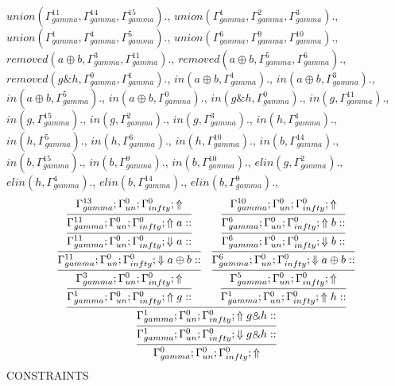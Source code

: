 \documentclass[a4paper, 11pt]{article}
\begin{document}
$union(\Gamma_{gamma}^{11}, \Gamma_{gamma}^{14}, \Gamma_{gamma}^{15}).$, $union(\Gamma_{gamma}^{1}, \Gamma_{gamma}^{2}, \Gamma_{gamma}^{3}).$, $union(\Gamma_{gamma}^{1}, \Gamma_{gamma}^{4}, \Gamma_{gamma}^{5}).$, $union(\Gamma_{gamma}^{6}, \Gamma_{gamma}^{9}, \Gamma_{gamma}^{10}).$, $removed(a \oplus b, \Gamma_{gamma}^{3}, \Gamma_{gamma}^{11}).$, $removed(a \oplus b, \Gamma_{gamma}^{5}, \Gamma_{gamma}^{6}).$, $removed(g \binampersand h, \Gamma_{gamma}^{0}, \Gamma_{gamma}^{1}).$, $in(a \oplus b, \Gamma_{gamma}^{1}).$, $in(a \oplus b, \Gamma_{gamma}^{3}).$, $in(a \oplus b, \Gamma_{gamma}^{5}).$, $in(a \oplus b, \Gamma_{gamma}^{0}).$, $in(g \binampersand h, \Gamma_{gamma}^{0}).$, $in(g, \Gamma_{gamma}^{11}).$, $in(g, \Gamma_{gamma}^{15}).$, $in(g, \Gamma_{gamma}^{2}).$, $in(g, \Gamma_{gamma}^{3}).$, $in(h, \Gamma_{gamma}^{4}).$, $in(h, \Gamma_{gamma}^{5}).$, $in(h, \Gamma_{gamma}^{6}).$, $in(h, \Gamma_{gamma}^{10}).$, $in(b, \Gamma_{gamma}^{14}).$, $in(b, \Gamma_{gamma}^{15}).$, $in(b, \Gamma_{gamma}^{9}).$, $in(b, \Gamma_{gamma}^{10}).$, $elin(g, \Gamma_{gamma}^{2}).$, $elin(h, \Gamma_{gamma}^{4}).$, $elin(b, \Gamma_{gamma}^{14}).$, $elin(b, \Gamma_{gamma}^{9}).$, 
\[
\infer{\Gamma_{ gamma}^{0} ; \Gamma_{un}^{0} ; \Gamma_{ infty}^{0} ;  \Uparrow }
{\infer{\Gamma_{ gamma}^{1} ; \Gamma_{un}^{0} ; \Gamma_{ infty}^{0} ;  \Downarrow g \binampersand h :: }
{\infer{\Gamma_{ gamma}^{1} ; \Gamma_{un}^{0} ; \Gamma_{ infty}^{0} ;  \Uparrow g \binampersand h :: }
{\infer{\Gamma_{ gamma}^{1} ; \Gamma_{un}^{0} ; \Gamma_{ infty}^{0} ;  \Uparrow g :: }
{\infer{\Gamma_{ gamma}^{3} ; \Gamma_{un}^{0} ; \Gamma_{ infty}^{0} ;  \Uparrow }
{\infer{\Gamma_{ gamma}^{11} ; \Gamma_{un}^{0} ; \Gamma_{ infty}^{0} ;  \Downarrow a \oplus b :: }
{\infer{\Gamma_{ gamma}^{11} ; \Gamma_{un}^{0} ; \Gamma_{ infty}^{0} ;  \Downarrow a :: }
{\infer{\Gamma_{ gamma}^{11} ; \Gamma_{un}^{0} ; \Gamma_{ infty}^{0} ;  \Uparrow a :: }
{\Gamma_{ gamma}^{13} ; \Gamma_{un}^{0} ; \Gamma_{ infty}^{0} ;  \Uparrow }}}}}
&
\infer{\Gamma_{ gamma}^{1} ; \Gamma_{un}^{0} ; \Gamma_{ infty}^{0} ;  \Uparrow h :: }
{\infer{\Gamma_{ gamma}^{5} ; \Gamma_{un}^{0} ; \Gamma_{ infty}^{0} ;  \Uparrow }
{\infer{\Gamma_{ gamma}^{6} ; \Gamma_{un}^{0} ; \Gamma_{ infty}^{0} ;  \Downarrow a \oplus b :: }
{\infer{\Gamma_{ gamma}^{6} ; \Gamma_{un}^{0} ; \Gamma_{ infty}^{0} ;  \Downarrow b :: }
{\infer{\Gamma_{ gamma}^{6} ; \Gamma_{un}^{0} ; \Gamma_{ infty}^{0} ;  \Uparrow b :: }
{\Gamma_{ gamma}^{10} ; \Gamma_{un}^{0} ; \Gamma_{ infty}^{0} ;  \Uparrow }}}}}}}}
\]
CONSTRAINTS
\end{document}
